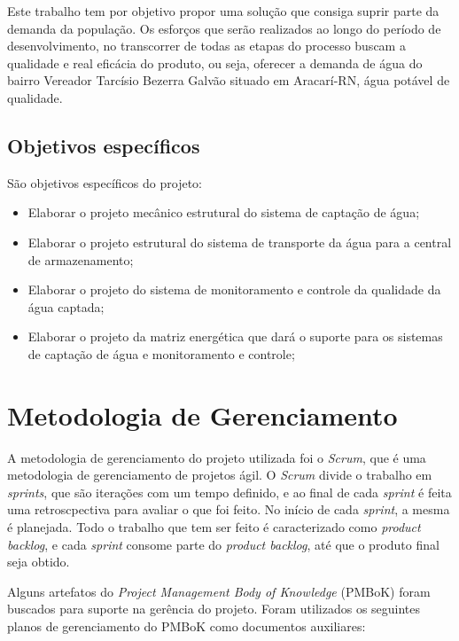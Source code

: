 Este trabalho tem por objetivo propor uma solução que consiga suprir parte da demanda da população. Os esforços que serão
realizados ao longo do período de desenvolvimento, no transcorrer de todas as etapas do processo buscam a qualidade e real
eficácia do produto, ou seja, oferecer a demanda de água do bairro Vereador Tarcísio Bezerra Galvão situado em Aracarí-RN, 
água potável de qualidade.

 \subsection{Objetivos específicos}
 
 São objetivos específicos do projeto:
 \begin{itemize}
  \item Elaborar o projeto mecânico estrutural do sistema de captação de água;
  \item Elaborar o projeto estrutural do sistema de transporte da água para a central de armazenamento;
  \item Elaborar o projeto do sistema de monitoramento e controle da qualidade da água captada;
  \item Elaborar o projeto da matriz energética que dará o suporte para os sistemas de captação de água e monitoramento e controle;
 \end{itemize}

 
\section{Metodologia de Gerenciamento}

A metodologia de gerenciamento do projeto utilizada foi o \textit{Scrum}, que é uma metodologia de gerenciamento de projetos ágil.
O \textit{Scrum} divide o trabalho em \textit{sprints}, que são iterações com um tempo definido, e ao final de cada 
\textit{sprint} é feita uma retroscpectiva para avaliar o que foi feito. No início de cada \textit{sprint},
a mesma é planejada. Todo o trabalho que tem ser feito é caracterizado como \textit{product backlog}, e cada \textit{sprint}
consome parte do \textit{product backlog}, até que o produto final seja obtido.

Alguns artefatos do \textit{Project Management Body of Knowledge} (PMBoK) foram buscados para suporte na gerência do projeto.
Foram utilizados os seguintes planos de gerenciamento do PMBoK como documentos auxiliares:

